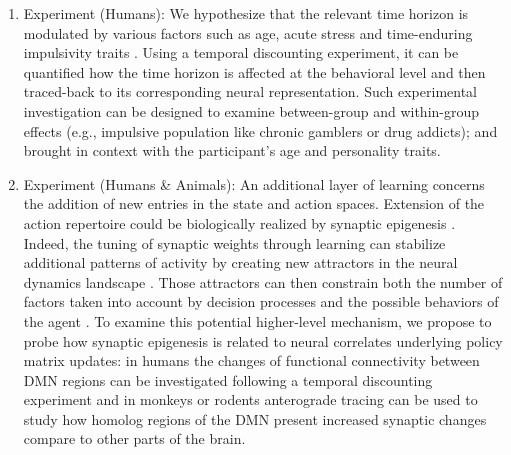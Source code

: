 \documentclass[10pt,letterpaper]{article}
\begin{document}
\begin{mdframed}
\begin{enumerate}
\item Experiment (Humans): We hypothesize that the relevant time horizon is modulated by various factors such as age, acute stress and time-enduring impulsivity traits
\citep{luksys2009stress, haushofer2014psychology}.
Using a temporal discounting experiment, it can be quantified how the time horizon is affected at the behavioral level and then traced-back to its corresponding neural representation. Such experimental investigation can be designed to examine between-group and within-group effects (e.g., impulsive population like chronic gamblers or drug addicts); and brought in context with the participant’s age and personality traits.


\item Experiment (Humans \& Animals): An additional layer of learning concerns the addition of new entries in the state and action spaces. Extension of the action repertoire could be biologically realized by synaptic epigenesis \citep{gisiger_acquisition_2005}. Indeed, the tuning of synaptic weights through learning can stabilize additional patterns of activity by creating new attractors in the neural dynamics landscape \citep{takeuchi_synaptic_2014}. Those attractors can then constrain both the number of factors taken into account by decision processes and the possible behaviors of the agent \citep{wang_decision_2008}. To examine this potential higher-level mechanism, we propose to probe how synaptic epigenesis is related to neural correlates underlying policy matrix updates: in humans the changes of functional connectivity between DMN regions can be investigated following a temporal discounting experiment and in monkeys or rodents anterograde tracing can be used to study how homolog regions of the DMN present increased synaptic changes compare to other parts of the brain.

\end{enumerate}
\end{mdframed}
\end{document}
